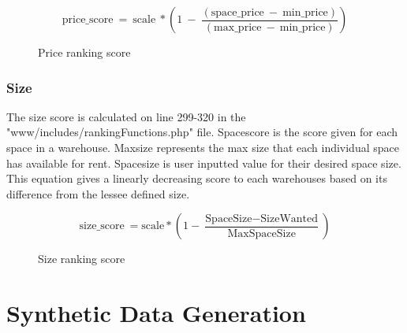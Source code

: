 \begin{figure}[h]
\[\mathrm{price\_ score}\ =\mathrm{\ scale\ }\ast\left(1\ -\ \frac{\left(\mathrm{space\_ price\ }-\mathrm{\ min\_ price}\right)}{\left(\mathrm{max\_ price}\ -\ \mathrm{min\_ price}\right)}\right)\]
\caption{Price ranking score}
\label{fig:price}
\end{figure}

\subsubsection{Size}
The size score is calculated on line 299-320 in the "www/includes/rankingFunctions.php" file. Space\textunderscore score is the score given for each space in a warehouse. Max\textunderscore size represents the max size that each individual space has available for rent. Space\textunderscore size is user inputted value for their desired space size. This equation gives a linearly decreasing score to each warehouses based on its difference from the lessee defined size.  

\begin{figure}[h]

\[\mathrm{size\_ score}\ =\text{scale} * (1-\frac{\text{SpaceSize} - \text{SizeWanted}}{\text{MaxSpaceSize}})\]
\caption{Size ranking score}
\label{fig:size}
\end{figure}
\newpage
\section{Synthetic Data Generation}

